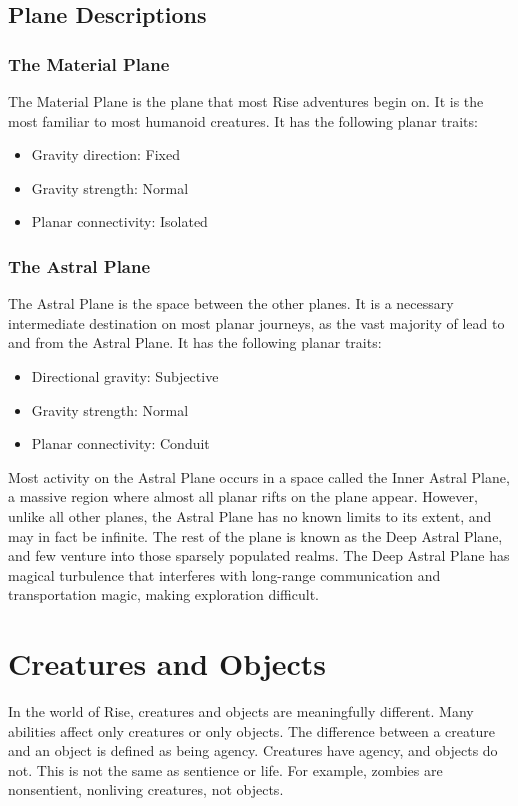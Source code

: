 
    \subsection{Plane Descriptions}
        \subsubsection{The Material Plane}
            The Material Plane is the plane that most Rise adventures begin on.
            It is the most familiar to most humanoid creatures.
            It has the following planar traits:
            \begin{itemize}
                \item Gravity direction: Fixed
                \item Gravity strength: Normal
                \item Planar connectivity: Isolated
            \end{itemize}

        \subsubsection{The Astral Plane}\label{The Astral Plane}
            The Astral Plane is the space between the other planes.
            It is a necessary intermediate destination on most planar journeys, as the vast majority of  lead to and from the Astral Plane.
            It has the following planar traits:
            \begin{itemize}
                \item Directional gravity: Subjective
                \item Gravity strength: Normal
                \item Planar connectivity: Conduit
            \end{itemize}

            Most activity on the Astral Plane occurs in a space called the Inner Astral Plane, a massive region where almost all planar rifts on the plane appear.
            However, unlike all other planes, the Astral Plane has no known limits to its extent, and may in fact be infinite.
            The rest of the plane is known as the Deep Astral Plane, and few venture into those sparsely populated realms.
            The Deep Astral Plane has magical turbulence that interferes with long-range communication and transportation magic, making exploration difficult.

\section{Creatures and Objects}
    In the world of Rise, creatures and objects are meaningfully different.
    Many abilities affect only creatures or only objects.
    The difference between a creature and an object is defined as being agency.
    Creatures have agency, and objects do not.
    This is not the same as sentience or life.
    For example, zombies are nonsentient, nonliving creatures, not objects.

